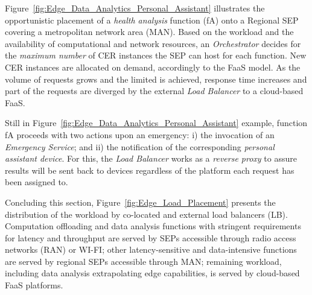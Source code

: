 Figure~\ref{fig:Edge_Data_Analytics_Personal_Assistant} illustrates the opportunistic placement of a \textit{health analysis} function (fA) onto a Regional SEP covering a metropolitan network area (MAN). Based on the workload and the availability of computational and network resources, an \textit{Orchestrator} decides for the \textit{maximum number} of CER instances the SEP can host for each function.
New CER instances are allocated on demand, accordingly to the FaaS model. As the volume of requests grows and the limited is achieved, response time increases and part of the requests are diverged
by the external \textit{Load Balancer} to a cloud-based FaaS.
%

Still in Figure~\ref{fig:Edge_Data_Analytics_Personal_Assistant} example, 
function fA proceeds with two actions upon an emergency: i) the invocation of an 
\textit{Emergency Service}; and ii) the notification of the corresponding \textit{personal assistant device}. For this, the \textit{Load Balancer} works as a \textit{reverse proxy} to assure results will be sent back to devices regardless of the platform each request has been assigned to.

Concluding this section, 
Figure~\ref{fig:Edge_Load_Placement} presents the distribution of the workload by co-located and external load balancers (LB). Computation offloading and data analysis functions with stringent requirements for latency and throughput are served by SEPs accessible through radio access networks (RAN) or WI-FI;
other latency-sensitive and data-intensive functions are served by regional SEPs accessible through MAN; 
remaining workload, including data analysis extrapolating edge capabilities, is served by cloud-based FaaS platforms. 








